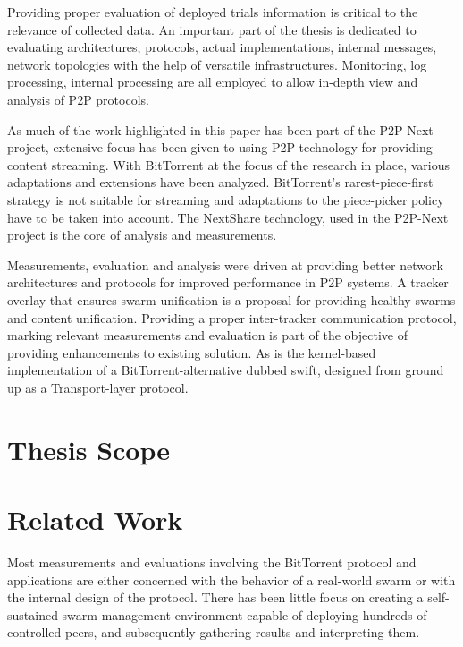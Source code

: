 Providing proper evaluation of deployed trials information is critical to the
relevance of collected data. An important part of the thesis is dedicated to
evaluating architectures, protocols, actual implementations, internal
messages, network topologies with the help of versatile infrastructures.
Monitoring, log processing, internal processing are all employed to allow
in-depth view and analysis of P2P protocols.

As much of the work highlighted in this paper has been part of the
P2P-Next project, extensive focus has been given to using P2P technology for
providing content streaming. With BitTorrent at the focus of the research in
place, various adaptations and extensions have been analyzed. BitTorrent's
rarest-piece-first strategy is not suitable for streaming and adaptations to
the piece-picker policy have to be taken into account. The NextShare
technology, used in the P2P-Next project is the core of analysis and
measurements.

Measurements, evaluation and analysis were driven at providing better network
architectures and protocols for improved performance in P2P systems. A tracker
overlay that ensures swarm unification is a proposal for providing healthy
swarms and content unification. Providing a proper inter-tracker communication
protocol, marking relevant measurements and evaluation is part of the objective
of providing enhancements to existing solution. As is the kernel-based
implementation of a BitTorrent-alternative dubbed swift, designed from ground
up as a Transport-layer protocol.

\section{Thesis Scope}
\label{sec:intro:scope}


\section{Related Work}
\label{sec:intro:related}



Most measurements and evaluations involving the BitTorrent protocol and
applications are either concerned with the behavior of a real-world swarm or
with the internal design of the protocol. There has been little focus on
creating a self-sustained swarm management environment capable of deploying
hundreds of controlled peers, and subsequently gathering results and
interpreting them.

